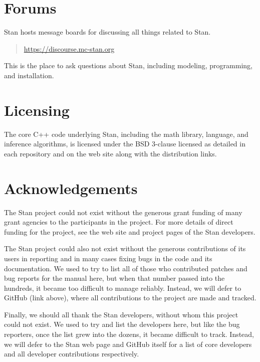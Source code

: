 \section*{Forums}

Stan hosts message boards for discussing all things
related to Stan.  
%
\begin{quote}
\url{https://discourse.mc-stan.org}
\end{quote}
%
This is the place to ask questions about Stan, including modeling,
programming, and installation.


\section*{Licensing}

The core C++ code underlying Stan, including the math library,
language, and inference algorithms, is licensed under the BSD 3-clause
licensed as detailed in each repository and on the web site along
with the distribution links.


\section*{Acknowledgements}

The Stan project could not exist without the generous grant
funding of many grant agencies to the participants in the project.
For more details of direct funding for the project, see the web site
and project pages of the Stan developers.

The Stan project could also not exist without the generous
contributions of its users in reporting and in many cases fixing bugs
in the code and its documentation.  We used to try to list all of
those who contributed patches and bug reports for the manual here, but
when that number passed into the hundreds, it became too difficult to
manage reliably.  Instead, we will defer to GitHub (link above), where
all contributions to the project are made and tracked.

Finally, we should all thank the Stan developers, without whom this
project could not exist.  We used to try and list the developers here,
but like the bug reporters, once the list grew into the dozens, it
became difficult to track.  Instead, we will defer to the Stan web
page and GitHub itself for a list of core developers and all developer
contributions respectively.
